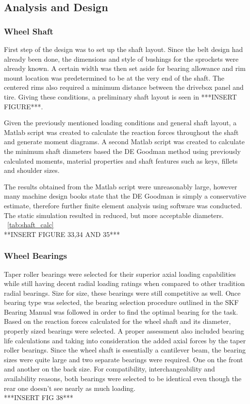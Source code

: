 \subsection{Analysis and Design}
\subsubsection{Wheel Shaft}
First step of the design was to set up the shaft layout. Since the belt design had already been done, the dimensions and style of bushings for the sprockets were already known. A certain width was then set aside for bearing allowance and rim mount location was predetermined to be at the very end of the shaft. The centered rims also required a minimum distance between the drivebox panel and tire. Giving these conditions, a preliminary shaft layout is seen in ***INSERT FIGURE***.

Given the previously mentioned loading conditions and general shaft layout, a Matlab script was created to calculate the reaction forces throughout the shaft and generate moment diagrams. A second Matlab script was created to calculate the minimum shaft diameters based the DE Goodman method using previously calculated moments, material properties and shaft features such as keys, fillets and shoulder sizes.

The results obtained from the Matlab script were unreasonably large, however many machine design books state that the DE Goodman is simply a conservative estimate, therefore further finite element analysis using software was conducted. The static simulation resulted in reduced, but more acceptable diameters. 
~\ref {tab:shaft_calc}
\\
**INSERT FIGURE 33,34 AND 35***
\\

\subsubsection{Wheel Bearings}
Taper roller bearings were selected for their superior axial loading capabilities while still having decent radial loading ratings when compared to other tradition radial bearings. Size for size, these bearings were still competitive as well. Once bearing type was selected, the bearing selection procedure outlined in the SKF Bearing Manual was followed in order to find the optimal bearing for the task. Based on the reaction forces calculated for the wheel shaft and its diameter, properly sized bearings were selected. A proper assessment also included bearing life calculations and taking into consideration the added axial forces by the taper roller bearings. Since the wheel shaft is essentially a cantilever beam, the bearing sizes were quite large and two separate bearings were required. One on the front and another on the back size. For compatibility, interchangeability and availability reasons, both bearings were selected to be identical even though the rear one doesn't see nearly as much loading.
\\
***INSERT FIG 38***

